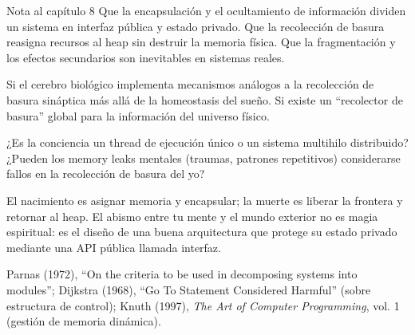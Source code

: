 \begin{notacap}{Nota al capítulo 8}
 Que la encapsulación y el ocultamiento de información dividen un sistema en interfaz pública y estado privado. Que la recolección de basura reasigna recursos al heap sin destruir la memoria física. Que la fragmentación y los efectos secundarios son inevitables en sistemas reales.

 Si el cerebro biológico implementa mecanismos análogos a la recolección de basura sináptica más allá de la homeostasis del sueño. Si existe un “recolector de basura” global para la información del universo físico.

 ¿Es la conciencia un thread de ejecución único o un sistema multihilo distribuido? ¿Pueden los memory leaks mentales (traumas, patrones repetitivos) considerarse fallos en la recolección de basura del yo?

 El nacimiento es asignar memoria y encapsular; la muerte es liberar la frontera y retornar al heap. El abismo entre tu mente y el mundo exterior no es magia espiritual: es el diseño de una buena arquitectura que protege su estado privado mediante una API pública llamada interfaz.

 Parnas (1972), “On the criteria to be used in decomposing systems into modules”; Dijkstra (1968), “Go To Statement Considered Harmful” (sobre estructura de control); Knuth (1997), \emph{The Art of Computer Programming}, vol. 1 (gestión de memoria dinámica).
\end{notacap}
